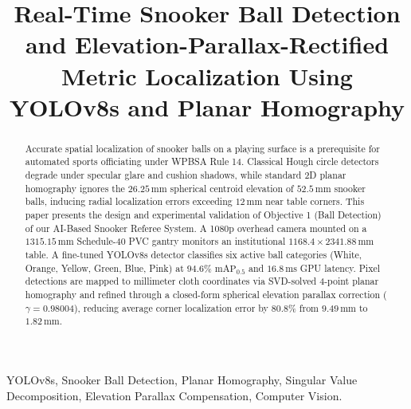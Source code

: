 \documentclass[conference]{IEEEtran}
\begin{document}
\title{Real-Time Snooker Ball Detection and Elevation-Parallax-Rectified Metric Localization Using YOLOv8s and Planar Homography}

\author{
}

\maketitle

\begin{abstract}
Accurate spatial localization of snooker balls on a playing surface is a prerequisite for automated sports officiating under WPBSA Rule 14. Classical Hough circle detectors degrade under specular glare and cushion shadows, while standard 2D planar homography ignores the $26.25\,\text{mm}$ spherical centroid elevation of $52.5\,\text{mm}$ snooker balls, inducing radial localization errors exceeding $12\,\text{mm}$ near table corners. This paper presents the design and experimental validation of Objective 1 (Ball Detection) of our AI-Based Snooker Referee System. A 1080p overhead camera mounted on a $1315.15\,\text{mm}$ Schedule-40 PVC gantry monitors an institutional $1168.4 \times 2341.88\,\text{mm}$ table. A fine-tuned YOLOv8s detector classifies six active ball categories (White, Orange, Yellow, Green, Blue, Pink) at $94.6\%$ $\text{mAP}_{0.5}$ and $16.8\,\text{ms}$ GPU latency. Pixel detections are mapped to millimeter cloth coordinates via SVD-solved 4-point planar homography and refined through a closed-form spherical elevation parallax correction ($\gamma = 0.98004$), reducing average corner localization error by $80.8\%$ from $9.49\,\text{mm}$ to $1.82\,\text{mm}$.
\end{abstract}

\begin{IEEEkeywords}
YOLOv8s, Snooker Ball Detection, Planar Homography, Singular Value Decomposition, Elevation Parallax Compensation, Computer Vision.
\end{IEEEkeywords}
\end{document}
